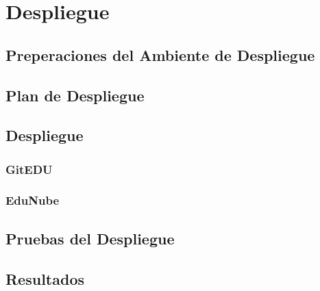 
\chapter{Despliegue}
\label{capitulo6}

\section{Preperaciones del Ambiente de Despliegue}

\section{Plan de Despliegue}

\section{Despliegue}

\subsection{GitEDU}

\subsection{EduNube}

\section{Pruebas del Despliegue}

\section{Resultados}

